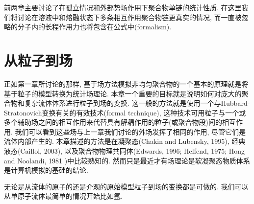     前两章主要讨论了在孤立情况和外部势场作用下聚合物单链的统计性质.
    在这里我们将讨论在溶液中和熔融状态下多条相互作用聚合物链更真实的情况,
    而一直被忽略的分子内的长程作用力也将包含在公式中(formalism).
    \section{从粒子到场}
    正如第一章所讨论的那样,
    基于场方法模拟非均匀聚合物的一个基本的原理就是将基于粒子的模型转换为统计场理论.
    本章一个重要的目标就是说明如何对庞大的聚合物和复杂流体体系进行粒子到场的变换.
    这一般的方法就是使用一个与Hubbard-Stratonovich变换有关的有效技术(formal
    technique),
    这种技术可用粒子与一个或多个辅助场之间的相互作用来代替具有解耦作用的粒子(或聚合物段)间的相互作用.
    我们可以看到这些场与上一章我们讨论的外场发挥了相同的作用,
    尽管它们是流体内部产生的. 本章描述的方法是在凝聚态(Chakin and Lubensky,
    1995), 经典液态(Caillol, 2003), 以及聚合物物理共同体(Edwards, 1996;
    Helfend, 1975; Hong and Noolandi, 1981 )中比较熟知的.
    然而只是最近才有场理论是软凝聚态物质体系是计算机模拟的基础的结论.
    \par
    无论是从流体的原子的还是介观的原始模型粒子到场的变换都是可做的.
    我们可以从单原子流体最简单的情况开始比如氩. 
